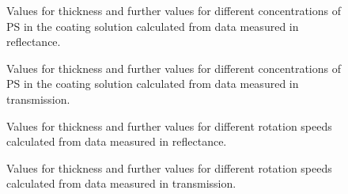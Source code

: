 \begin{figure}[h]
    
    \caption{Values for thickness and further values for different concentrations of PS in the coating solution calculated from data measured in reflectance.}
    \label{tab:ConcThickRef}
\end{figure}

\begin{figure}[h]
    
    \caption{Values for thickness and further values for different concentrations of PS in the coating solution calculated from data measured in transmission.}
    \label{tab:ConcThickTrans}
\end{figure}

\begin{figure}[h]
    
    \caption{Values for thickness and further values for different rotation speeds calculated from data measured in reflectance.}
    \label{tab:RotThickRef}
\end{figure}

\begin{figure}[h]
    
    \caption{Values for thickness and further values for different rotation speeds calculated from data measured in transmission.}
    \label{tab:RotThickTrans}
\end{figure}